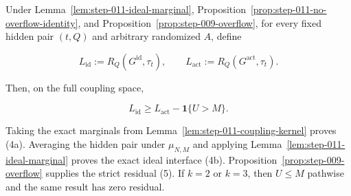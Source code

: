 \begin{proposition}\label{prop:step-011-risk-transfer}
Under Lemma~\ref{lem:step-011-ideal-marginal},
Proposition~\ref{prop:step-011-no-overflow-identity}, and Proposition~\ref{prop:step-009-overflow}, for every fixed hidden pair
\((t,Q)\) and arbitrary randomized \(A\), define

\[
  L_{\mathrm{id}}:=R_Q(G^{\mathrm{id}},\tau_t),
  \qquad
  L_{\mathrm{act}}:=R_Q(G^{\mathrm{act}},\tau_t).
\tag{23}
\]

Then, on the full coupling space,

\[
  L_{\mathrm{id}}
  \ge L_{\mathrm{act}}-\mathbf1\{U>M\}.
\tag{24}
\]

Taking the exact marginals from
Lemma~\ref{lem:step-011-coupling-kernel} proves (4a). Averaging the hidden
pair under \(\mu_{N,M}\) and applying
Lemma~\ref{lem:step-011-ideal-marginal} proves the exact ideal
interface (4b). Proposition~\ref{prop:step-009-overflow} supplies
the strict residual (5).
If \(k=2\) or \(k=3\), then \(U\le M\) pathwise and the same result has
zero residual.
\end{proposition}

